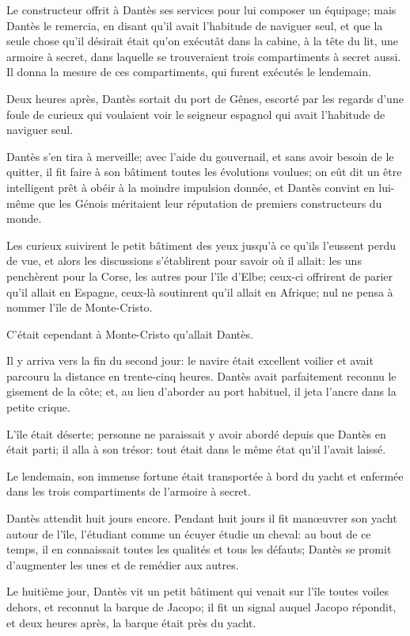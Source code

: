Le constructeur offrit à Dantès ses services pour lui composer un équipage; mais Dantès le remercia, en disant qu'il avait l'habitude de naviguer seul, et que la seule chose qu'il désirait était qu'on exécutât dans la cabine, à la tête du lit, une armoire à secret, dans laquelle se trouveraient trois compartiments à secret aussi. Il donna la mesure de ces compartiments, qui furent exécutés le lendemain.

Deux heures après, Dantès sortait du port de Gênes, escorté par les regards d'une foule de curieux qui voulaient voir le seigneur espagnol qui avait l'habitude de naviguer seul.

Dantès s'en tira à merveille; avec l'aide du gouvernail, et sans avoir besoin de le quitter, il fit faire à son bâtiment toutes les évolutions voulues; on eût dit un être intelligent prêt à obéir à la moindre impulsion donnée, et Dantès convint en lui-même que les Génois méritaient leur réputation de premiers constructeurs du monde.

Les curieux suivirent le petit bâtiment des yeux jusqu'à ce qu'ils l'eussent perdu de vue, et alors les discussions s'établirent pour savoir où il allait: les uns penchèrent pour la Corse, les autres pour l'île d'Elbe; ceux-ci offrirent de parier qu'il allait en Espagne, ceux-là soutinrent qu'il allait en Afrique; nul ne pensa à nommer l'île de Monte-Cristo.

C'était cependant à Monte-Cristo qu'allait Dantès.

Il y arriva vers la fin du second jour: le navire était excellent voilier et avait parcouru la distance en trente-cinq heures. Dantès avait parfaitement reconnu le gisement de la côte; et, au lieu d'aborder au port habituel, il jeta l'ancre dans la petite crique.

L'île était déserte; personne ne paraissait y avoir abordé depuis que Dantès en était parti; il alla à son trésor: tout était dans le même état qu'il l'avait laissé.

Le lendemain, son immense fortune était transportée à bord du yacht et enfermée dans les trois compartiments de l'armoire à secret.

Dantès attendit huit jours encore. Pendant huit jours il fit manœuvrer son yacht autour de l'île, l'étudiant comme un écuyer étudie un cheval: au bout de ce temps, il en connaissait toutes les qualités et tous les défauts; Dantès se promit d'augmenter les unes et de remédier aux autres.

Le huitième jour, Dantès vit un petit bâtiment qui venait sur l'île toutes voiles dehors, et reconnut la barque de Jacopo; il fit un signal auquel Jacopo répondit, et deux heures après, la barque était près du yacht.


